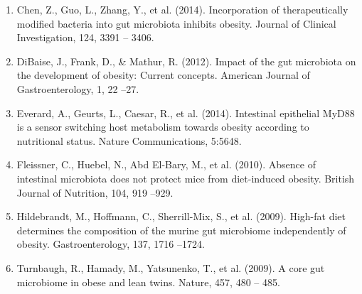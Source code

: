 \documentclass[11pt,letterpaper,final] {article}
\begin{document}
\begin{enumerate}
\item Chen, Z., Guo, L., Zhang, Y., et al. (2014). Incorporation of therapeutically modified bacteria into gut microbiota inhibits obesity. Journal of Clinical Investigation, 124, 3391 -- 3406.
\item DiBaise, J., Frank, D., \& Mathur, R. (2012). Impact of the gut microbiota on the development of obesity: Current concepts. American Journal of Gastroenterology, 1, 22 --27.
\item Everard, A., Geurts, L., Caesar, R., et al. (2014). Intestinal epithelial MyD88 is a sensor switching host metabolism towards obesity according to nutritional status. Nature Communications, 5:5648.
\item Fleissner, C., Huebel, N., Abd El-Bary, M., et al. (2010). Absence of intestinal microbiota does not protect mice from diet-induced obesity. British Journal of Nutrition, 104, 919 --929.
\item Hildebrandt, M., Hoffmann, C., Sherrill-Mix, S., et al. (2009). High-fat diet determines the composition of the murine gut microbiome independently of obesity. Gastroenterology, 137, 1716 --1724.
\item Turnbaugh, R., Hamady, M., Yatsunenko, T., et al. (2009). A core gut microbiome in obese and lean twins. Nature, 457, 480 -- 485.
\end{enumerate}
\end{document}
